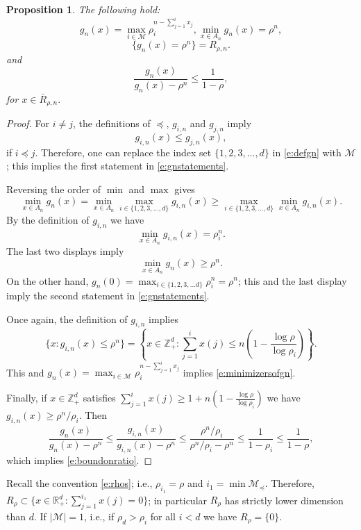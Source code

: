 \documentclass[11pt,a4paper]{article}
\newtheorem{proposition}{Proposition}[section]
\begin{document}
\begin{proposition}\label{p:aboutgn}
The following hold:
\begin{equation}\label{e:gnstatements}
g_n(x) = \max_{i \in {\mathscr M}} \rho_i^{n -\sum_{j=1}^i x_j}, \min_{x \in A_n} g_n(x) = \rho^n,
\end{equation}
\begin{equation}\label{e:minimizersofgn}
\{g_n(x) = \rho^n\} =  R_{\rho,n}.
\end{equation}
and
\begin{equation}\label{e:boundonratio}
\frac{g_n(x)}{g_n(x) - \rho^n} \le \frac{1}{1-\rho},
\end{equation}
for $x \in \bar{R}_{\rho,n}.$
\end{proposition}
\begin{proof}
For $i \neq j$,
the definitions of $\preccurlyeq$, $g_{i,n}$ and $g_{j,n}$ imply
\[
g_{i,n}(x) \le g_{j,n}(x),
\]
if $i \preccurlyeq j$. Therefore, one can replace the index set $\{1,2,3,...,d\}$ in \eqref{e:defgn} 
with ${\mathscr M}$; this implies the first statement in \eqref{e:gnstatements}.

Reversing the order of $\min$ and $\max$ gives
\[
\min_{x \in A_n} g_n(x) = \min_{x \in A_n} \max_{i \in \{1,2,3,...,d\}}g_{i,n}(x)
\ge \max_{i \in \{1,2,3,...,d\}} \min_{x \in A_n} g_{i,n}(x).
\]
By the definition of $g_{i,n}$ we have
\[
\min_{x \in A_n} g_{i,n}(x) = \rho_i^n.
\]
The last two displays imply
\[
\min_{x \in A_n}g_n(x) \ge \rho^n.
\]
On the other hand, $g_{n}(0) = \max_{i \in \{1,2,3,...d\}}  \rho_i^n = \rho^n$; this
and the last display imply the second statement in \eqref{e:gnstatements}.

Once again, the definition of $g_{i,n}$ implies
\[
\{x: g_{i,n}(x) \le \rho^n \} =  \left\{x \in {\mathbb Z}^d_+: \sum_{j=1}^{i} x(j) \le n \left(1 - \frac{\log \rho}{\log \rho_i}\right) \right\}.
\]
This and $g_n(x) = \max_{i \in {\mathscr M}} \rho_i^{n -\sum_{j=1}^i x_j}$ implies 
\eqref{e:minimizersofgn}.

Finally, if $x\in {\mathbb Z}_+^d$ satisfies $\sum_{j=1}^{i} x(j) \ge 1+ n\left(1 - \frac{\log \rho}{\log \rho_i}\right)$ we have
$g_{i,n}(x) \ge \rho^n/ \rho_i.$ Then
\[
\frac{g_n(x)}{g_n(x) - \rho^n}
\le 
\frac{g_{i,n}(x)}{g_{i,n}(x) - \rho^n}
\le
\frac{\rho^n/\rho_i}{\rho^n/\rho_i - \rho^n} \le \frac{1}{1-\rho_i}
\le \frac{1}{1-\rho},
\]
which implies \eqref{e:boundonratio}.
\end{proof}
Recall the convention \eqref{e:rhos}; i.e., $\rho_{i_1} = \rho$ and $i_1 = \min{\mathcal M}_{\preccurlyeq}$.
Therefore,  
$R_{\rho} \subset \{x \in {\mathbb R}_+^d: \sum_{j=1}^{i_1} x(j) = 0 \}$;
in particular $R_\rho$ has strictly lower dimension than $d$. If 
$|{\mathscr M}| =1$, i.e., if $\rho_d > \rho_i$ for all $i < d$ we
have $R_{\rho} =\{0\}.$
\end{document}

